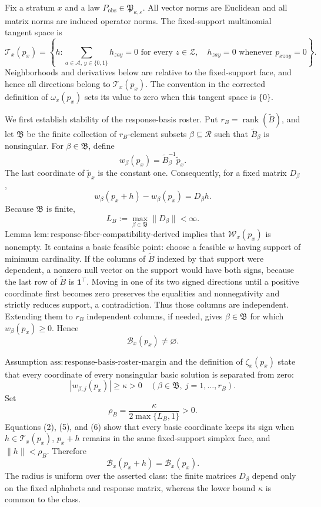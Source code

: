 Fix a stratum \(x\) and a law \(P_{\mathrm{obs}}\in
\mathfrak P_{\kappa,\varepsilon}\).  All vector norms are Euclidean and all
matrix norms are induced operator norms.  The fixed-support multinomial
tangent space is
\[
 \mathcal T_x(p_x)
 =\left\{h:
   \sum_{a\in\mathcal A,\,y\in\{0,1\}}h_{zay}=0
       \text{ for every }z\in\mathcal Z,\quad
   h_{zay}=0\text{ whenever }p_{xzay}=0
  \right\}.
 \tag{1}
\]
Neighborhoods and derivatives below are relative to the fixed-support face,
and hence all directions belong to \(\mathcal T_x(p_x)\).  The convention in
the corrected definition of \(\omega_x(p_x)\) sets its value to zero when this
tangent space is \(\{0\}\).

We first establish stability of the response-basis roster.  Put
\(r_B=\operatorname{rank}(\widetilde B)\), and let \(\mathfrak B\) be the
finite collection of \(r_B\)-element subsets \(\beta\subseteq\mathcal R\)
such that \(\widetilde B_\beta\) is nonsingular.  For
\(\beta\in\mathfrak B\), define
\[
 w_\beta(p_x)=\widetilde B_\beta^{-1}\widetilde p_x.
\]
The last coordinate of \(\widetilde p_x\) is the constant one.  Consequently,
for a fixed matrix \(D_\beta\),
\[
 w_\beta(p_x+h)-w_\beta(p_x)=D_\beta h.
 \tag{2}
\]
Because \(\mathfrak B\) is finite,
\[
 L_B:=\max_{\beta\in\mathfrak B}\|D_\beta\|<\infty.
 \tag{3}
\]
Lemma \(\mathrm{lem{:}response\mbox{-}fiber\mbox{-}compatibility\mbox{-}derived}\)
implies that \(\mathcal W_x(p_x)\) is nonempty.  It contains a basic feasible
point: choose a feasible \(w\) having support of minimum cardinality.  If the
columns of \(\widetilde B\) indexed by that support were dependent, a nonzero
null vector on the support would have both signs, because the last row of
\(\widetilde B\) is \(\mathbf 1^\top\).  Moving in one of its two signed
directions until a positive coordinate first becomes zero preserves the
equalities and nonnegativity and strictly reduces support, a contradiction.
Thus those columns are independent.  Extending them to \(r_B\) independent
columns, if needed, gives \(\beta\in\mathfrak B\) for which
\(w_\beta(p_x)\geq0\).  Hence
\[
 \mathcal B_x(p_x)\neq\varnothing.
 \tag{4}
\]

Assumption \(\mathrm{ass{:}response\mbox{-}basis\mbox{-}roster\mbox{-}margin}\)
and the definition of \(\zeta_x(p_x)\) state that every coordinate of every
nonsingular basic solution is separated from zero:
\[
 |w_{\beta,j}(p_x)|\geq\kappa>0
 \quad(\beta\in\mathfrak B,\ j=1,\ldots,r_B).
 \tag{5}
\]
Set
\[
 \rho_B=\frac{\kappa}{2\max\{L_B,1\}}>0.
 \tag{6}
\]
Equations (2), (5), and (6) show that every basic coordinate keeps its sign
when \(h\in\mathcal T_x(p_x)\), \(p_x+h\) remains in the same
fixed-support simplex face, and \(\|h\|<\rho_B\).  Therefore
\[
 \mathcal B_x(p_x+h)=\mathcal B_x(p_x).
 \tag{7}
\]
The radius is uniform over the asserted class: the finite matrices
\(D_\beta\) depend only on the fixed alphabets and response matrix, whereas
the lower bound \(\kappa\) is common to the class.

